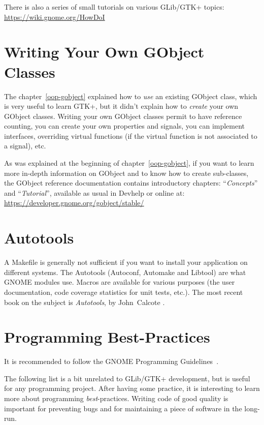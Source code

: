 There is also a series of small tutorials on various GLib/GTK+ topics:\\
\url{https://wiki.gnome.org/HowDoI}

\section{Writing Your Own GObject Classes}

The chapter~\ref{oop-gobject} explained how to \emph{use} an existing GObject class, which is very useful to learn GTK+, but it didn't explain how to \emph{create} your own GObject classes. Writing your own GObject classes permit to have reference counting, you can create your own properties and signals, you can implement interfaces, overriding virtual functions (if the virtual function is not associated to a signal), etc.

As was explained at the beginning of chapter~\ref{oop-gobject}, if you want to learn more in-depth information on GObject and to know how to create sub-classes, the GObject reference documentation contains introductory chapters: ``\emph{Concepts}'' and ``\emph{Tutorial}'', available as usual in Devhelp or online at:\\
\url{https://developer.gnome.org/gobject/stable/}

\section{Autotools}

A Makefile is generally not sufficient if you want to install your application on different systems. The Autotools (Autoconf, Automake and Libtool) are what GNOME modules use. Macros are available for various purposes (the user documentation, code coverage statistics for unit tests, etc.). The most recent book on the subject is \emph{Autotools}, by John~Calcote \cite{autotools}.

\section{Programming Best-Practices}

It is recommended to follow the GNOME Programming Guidelines~\cite{gnome-programming-guidelines}.

The following list is a bit unrelated to GLib/GTK+ development, but is useful for any programming project. After having some practice, it is interesting to learn more about programming \emph{best}-practices. Writing code of good quality is important for preventing bugs and for maintaining a piece of software in the long-run.

